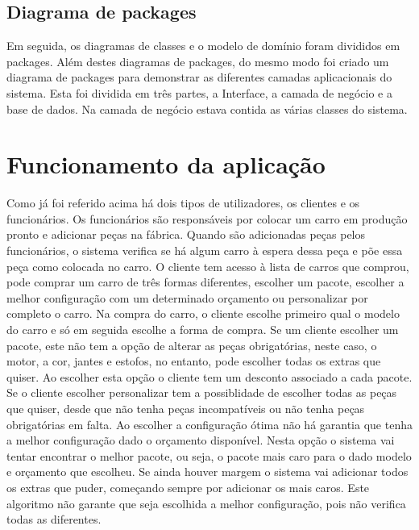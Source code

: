 \documentclass[10pt, a4paper]{article}
\begin{document}
\newpage
\subsection{Diagrama de packages}
Em seguida, os diagramas de classes e o modelo de domínio foram divididos em packages. Além destes diagramas de packages, do mesmo modo foi criado um diagrama de packages para demonstrar as diferentes camadas aplicacionais do sistema. Esta foi dividida em três partes, a Interface, a camada de negócio e a base de dados. Na camada de negócio estava contida as várias classes do sistema.


\newpage
\section{Funcionamento da aplicação}
Como já foi referido acima há dois tipos de utilizadores, os clientes e os funcionários. Os funcionários são responsáveis por colocar um carro em produção pronto e adicionar peças na fábrica. Quando são adicionadas peças pelos funcionários, o sistema verifica se há algum carro à espera dessa peça e põe essa peça como colocada no carro. O cliente tem acesso à lista de carros que comprou, pode comprar um carro de três formas diferentes, escolher um pacote, escolher a melhor configuração com um determinado orçamento ou personalizar por completo o carro. Na compra do carro, o cliente escolhe primeiro qual o modelo do carro e só em seguida escolhe a forma de compra. Se um cliente escolher um pacote, este não tem a opção de alterar as peças obrigatórias, neste caso, o motor, a cor, jantes e estofos, no entanto, pode escolher todas os extras que quiser. Ao escolher esta opção o cliente tem um desconto associado a cada pacote. Se o cliente escolher personalizar tem a possiblidade de escolher todas as peças que quiser, desde que não tenha peças incompatíveis ou não tenha peças obrigatórias em falta. Ao escolher a configuração ótima não há garantia que tenha a melhor configuração dado o orçamento disponível. Nesta opção o sistema vai tentar encontrar o melhor pacote, ou seja, o pacote mais caro para o dado modelo e orçamento que escolheu. Se ainda houver margem o sistema vai adicionar todos os extras que puder, começando sempre por adicionar os mais caros. Este algoritmo não garante que seja escolhida a melhor configuração, pois não verifica todas as diferentes.


\newpage
\end{document}
